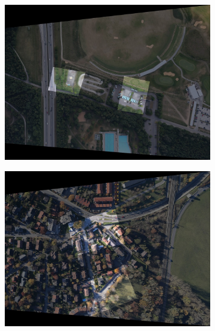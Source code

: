 \begin{figure}[tbp]
    \centering
       \begin{subfigure}[b]{0.243\textwidth}
           \centering
           \includegraphics[width=\textwidth]{figures_matches/rural_fused.jpg}
       \end{subfigure}
       \hfill
       \begin{subfigure}[b]{0.243\textwidth}  
           \centering 
           \includegraphics[width=\textwidth]{figures_matches/eichenau_fused.jpg}
       \end{subfigure}
       \hfill
       \begin{subfigure}[b]{0.243\textwidth}  

\end{subfigure}
\end{figure}
